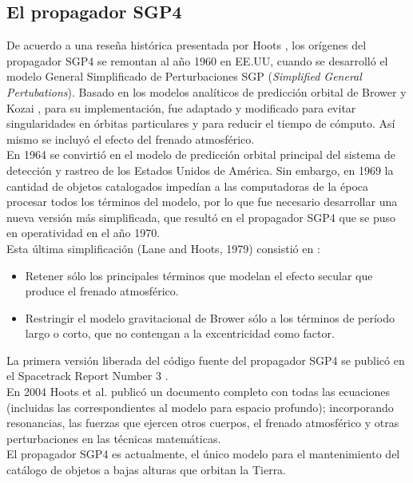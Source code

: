 {\subsection{El propagador SGP4}\label{subsec:sgp4model}
De acuerdo a una rese\~na hist\'orica presentada por Hoots \citep{hootshistoria}, los or\'igenes del propagador SGP4 se remontan al a\~no 1960 en EE.UU, cuando se desarroll\'o el modelo General Simplificado de Perturbaciones SGP  ({\it{Simplified General Pertubations}}). Basado en los modelos anal\'iticos de predicci\'on orbital de Brower \citep{brouwer1959solution} y Kozai \citep{kozai1962second}, para su implementaci\'on, fue adaptado y modificado para evitar singularidades en \'orbitas particulares y para reducir el tiempo de c\'omputo. As\'i mismo se incluy\'o el efecto del frenado atmosf\'erico.\\
En 1964 se convirti\'o en el modelo de predicci\'on orbital principal del sistema de detecci\'on y rastreo de los Estados Unidos de Am\'erica.
Sin embargo, en 1969 la cantidad de objetos catalogados imped\'ian a las computadoras de la \'epoca procesar todos los t\'erminos del modelo, por lo que fue necesario desarrollar una nueva versi\'on m\'as simplificada, que result\'o en el propagador SGP4 que se puso en operatividad en el a\~no 1970.\\

Esta \'ultima simplificaci\'on (Lane and Hoots, 1979) consisti\'o en :\\
\begin{itemize}
 \item Retener s\'olo los principales t\'erminos que modelan el efecto secular que produce el frenado atmosf\'erico.
 \item Restringir el modelo gravitacional de Brower s\'olo a los t\'erminos de per\'iodo largo o corto, que no contengan a la excentricidad como factor.
\end{itemize}

La primera versi\'on liberada del c\'odigo fuente del propagador SGP4 se public\'o en el Spacetrack Report Number 3 \citep{spacetrackreport3}.\\
En 2004 Hoots et al. public\'o un documento completo con todas las ecuaciones (incluidas las correspondientes al modelo para espacio profundo); incorporando resonancias, las fuerzas que ejercen otros cuerpos, el frenado atmosf\'erico y otras perturbaciones en las t\'ecnicas matem\'aticas.\\

El propagador SGP4 es actualmente, el \'unico modelo para el mantenimiento del cat\'alogo de objetos a bajas alturas que orbitan la Tierra. 

}

